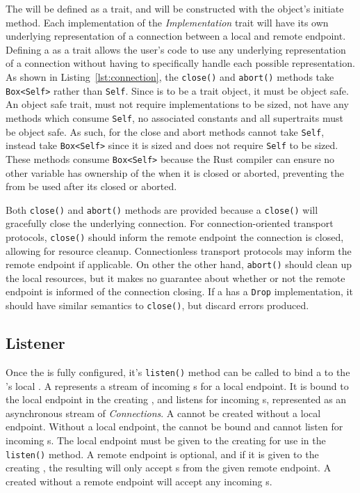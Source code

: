 The \connection{} will be defined as a trait, and will be constructed with the \preconnection{} object's
initiate method.
Each implementation of the \emph{Implementation} trait will have its own underlying representation of a connection
between a local and remote endpoint.
Defining a \connection{} as a trait allows the user's code to use any underlying representation of a connection
without having to specifically handle each possible representation.
As shown in Listing~\ref{lst:connection}, the \texttt{close()} and \texttt{abort()} methods take \texttt{Box<Self>}
rather than \texttt{Self}.
Since \connection{} is to be a trait object, it must be object safe.
An object safe trait, must not require implementations to be sized, not have any methods which consume \texttt{Self}, no
associated constants and all supertraits must be object safe.
As such, for the close and abort methods cannot take \texttt{Self}, instead take \texttt{Box<Self>} since it is sized
and does not require \texttt{Self} to be sized.
These methods consume \texttt{Box<Self>} because the Rust compiler can ensure no other variable has ownership of the
\connection{} when it is closed or aborted, preventing the \connection{} from be used after its closed or aborted.

Both \texttt{close()} and \texttt{abort()} methods are provided because a \texttt{close()} will gracefully close the
underlying connection.
For connection-oriented transport protocols, \texttt{close()} should inform the remote endpoint the connection
is closed, allowing for resource cleanup.
Connectionless transport protocols may inform the remote endpoint if applicable.
On other the other hand, \texttt{abort()} should clean up the local resources, but it makes no guarantee about whether
or not the remote endpoint is informed of the connection closing.
If a \connection{} has a \texttt{Drop} implementation, it should have similar semantics to \texttt{close()}, but
discard errors produced.

\subsection{Listener}\label{subsec:listener}
Once the \preconnection{} is fully configured, it's \texttt{listen()} method can be called to bind a \listener{} to the
\preconnection{}'s local \Endpoint{}.
A \listener{} represents a stream of incoming \connection{}s for a local endpoint.
It is bound to the local endpoint in the creating \preconnection{}, and listens for incoming \connection{}s,
represented as an asynchronous stream of \emph{Connections}.
A \listener{} cannot be created without a local endpoint.
Without a local endpoint, the \listener{} cannot be bound and cannot listen for incoming \connection{}s.
The local endpoint must be given to the creating \preconnection{} for use in the \texttt{listen()} method.
A remote endpoint is optional, and if it is given to the creating \preconnection{}, the resulting \listener{} will only
accept \connection{}s from the given remote endpoint.
A \listener{} created without a remote endpoint will accept any incoming \connection{}s.

